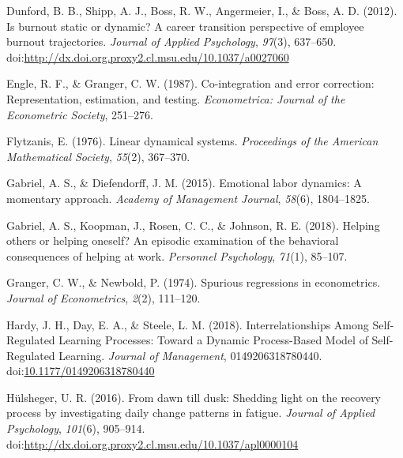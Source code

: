 \documentclass[english,,man]{apa6}
\theoremstyle{definition}
\theoremstyle{definition}
\theoremstyle{definition}
\theoremstyle{remark}
\begin{document}
\leavevmode\hypertarget{ref-dunford_is_2012}{}%
Dunford, B. B., Shipp, A. J., Boss, R. W., Angermeier, I., \& Boss, A.
D. (2012). Is burnout static or dynamic? A career transition perspective
of employee burnout trajectories. \emph{Journal of Applied Psychology},
\emph{97}(3), 637--650.
doi:\href{https://doi.org/http://dx.doi.org.proxy2.cl.msu.edu/10.1037/a0027060}{http://dx.doi.org.proxy2.cl.msu.edu/10.1037/a0027060}

\leavevmode\hypertarget{ref-engle_co-integration_1987}{}%
Engle, R. F., \& Granger, C. W. (1987). Co-integration and error
correction: Representation, estimation, and testing. \emph{Econometrica:
Journal of the Econometric Society}, 251--276.

\leavevmode\hypertarget{ref-flytzanis1976linear}{}%
Flytzanis, E. (1976). Linear dynamical systems. \emph{Proceedings of the
American Mathematical Society}, \emph{55}(2), 367--370.

\leavevmode\hypertarget{ref-gabriel_emotional_2015}{}%
Gabriel, A. S., \& Diefendorff, J. M. (2015). Emotional labor dynamics:
A momentary approach. \emph{Academy of Management Journal},
\emph{58}(6), 1804--1825.

\leavevmode\hypertarget{ref-gabriel_helping_2018}{}%
Gabriel, A. S., Koopman, J., Rosen, C. C., \& Johnson, R. E. (2018).
Helping others or helping oneself? An episodic examination of the
behavioral consequences of helping at work. \emph{Personnel Psychology},
\emph{71}(1), 85--107.

\leavevmode\hypertarget{ref-granger_spurious_1974}{}%
Granger, C. W., \& Newbold, P. (1974). Spurious regressions in
econometrics. \emph{Journal of Econometrics}, \emph{2}(2), 111--120.

\leavevmode\hypertarget{ref-hardy_interrelationships_2018}{}%
Hardy, J. H., Day, E. A., \& Steele, L. M. (2018). Interrelationships
Among Self-Regulated Learning Processes: Toward a Dynamic Process-Based
Model of Self-Regulated Learning. \emph{Journal of Management},
0149206318780440.
doi:\href{https://doi.org/10.1177/0149206318780440}{10.1177/0149206318780440}

\leavevmode\hypertarget{ref-hulsheger_dawn_2016}{}%
Hülsheger, U. R. (2016). From dawn till dusk: Shedding light on the
recovery process by investigating daily change patterns in fatigue.
\emph{Journal of Applied Psychology}, \emph{101}(6), 905--914.
doi:\href{https://doi.org/http://dx.doi.org.proxy2.cl.msu.edu/10.1037/apl0000104}{http://dx.doi.org.proxy2.cl.msu.edu/10.1037/apl0000104}
\end{document}

